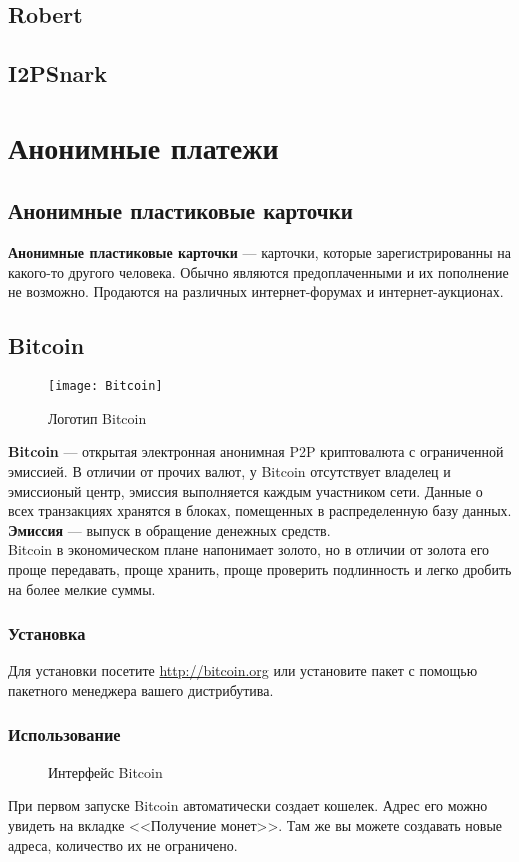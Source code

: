 \subsection{Robert}
\subsection{I2PSnark}

\section{Анонимные платежи}
\subsection{Анонимные пластиковые карточки}
\textbf{Анонимные пластиковые карточки} --- карточки, которые зарегистрированны на какого-то другого человека. Обычно являются предоплаченными и их пополнение не возможно. Продаются на различных интернет-форумах и интернет-аукционах.
\subsection{Bitcoin}
\begin{wrapfigure}[6]{r}{0.25\linewidth}
\texttt{[image: Bitcoin]}
\caption{Логотип Bitcoin}
\end{wrapfigure}
\textbf{Bitcoin} --- открытая электронная анонимная P2P криптовалюта с ограниченной эмиссией. В отличии от прочих валют, у Bitcoin отсутствует владелец и эмиссионый центр, эмиссия выполняется каждым участником сети. Данные о всех транзакциях хранятся в блоках, помещенных в распределенную базу данных.\\
\textbf{Эмиссия} --- выпуск в обращение денежных средств.\\
Bitcoin в экономическом плане напонимает золото, но в отличии от золота его проще передавать, проще хранить, проще проверить подлинность и легко дробить на более мелкие суммы.
\subsubsection{Установка}
Для установки посетите \url{http://bitcoin.org} или установите пакет с помощью пакетного менеджера вашего дистрибутива.
\subsubsection{Использование}
\begin{figure}[h]
\caption{Интерфейс Bitcoin}
\end{figure}
При первом запуске Bitcoin автоматически создает кошелек. Адрес его можно увидеть на вкладке <<Получение монет>>. Там же вы можете создавать новые адреса, количество их не ограничено.
